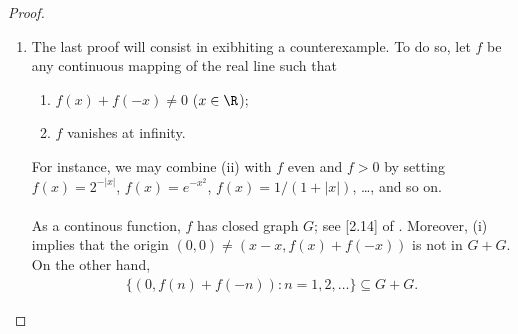 \begin{proof}
\begin{enumerate}
Now pick $c\in X$ outside $A+B$: %
The result will be established by showing that $c$ is not in the closure %
of $A+B$. \\
\\
To do so, we let the variable $\mathit{a}$ range over $A$: %
Every set $a+B$ is closed as well; see Section 1.7 of \cite{FA}. %
%
Trivially, $a+B \neq c$: By Section 1.10 of \cite{FA}, %
there so exists $V=V(a)$ a neighborhood of the origin such that %
%
\begin{align}\label{separation}
  (a+B + V) \cap (c+V) = \emptyset.
\end{align}
%
Moreover, there are finitely many $a+V$, say $a_1 + V_1, a_2 + V_2, \dots$, %
whose union $U$ contains the compact set $A$. Therefore, %
%
\begin{align}\label{U + B encloses A + B}
  A+B \subseteq U + B.
\end{align}
%
Now define %
\begin{align}
  W \triangleq V_1 \cap V_2 \cap \cdots, 
\end{align}
%
so that 
%
\begin{align}
  (a_i + B + V_i) \cap (c + W) \overset{(\ref{separation})}{=} \emptyset %
  \quad (i = 1, 2, \dots).
\end{align}
%
As a conclusion, $c$ is not in the closure of $U+B$. %
Finally, (\ref{U + B encloses A + B}) asserts that %
$c$ is not in $\overline{A+B}$ either; which achieves the proof. \\
\\
\textbf{Corollary}: If $B$ is the closure of a set $S$, then %
%
\begin{align}
  A+B \subseteq \overline{A+S} \subseteq \overline{A+B} = A + B
\end{align}
%
by (b) of Section 1.13 of \cite{FA} (since $A$ is closed; %
see Section 1.12, from the same source). %
The special case $A = \{x\}$, $B=X$ %
will occur in the proof of Exercise 15 in chapter 2. %
%
\item The last proof will consist in exibhiting a counterexample. %
To do so, let $f$ be any continuous mapping of the real line such that %
\renewcommand{\labelenumii}{(\roman{enumii})} 
\begin{enumerate}
  \item $f(x) + f(\minus x) \neq 0$ \quad ($x \in \R$);
  \item $f$ vanishes at infinity. 
\end{enumerate}
For instance, we may combine (ii) with $f$ even and $f>0$ by setting %
%
  $f(x) = 2^{\minus |x|}$, %
  $f(x) = e^{\minus x^2}$, %
  $f(x) = 1/(1+|x|)$, \dots, %
%
and so on. \\
\\
As a continous function, $f$ has closed graph $G$; see [2.14] of \cite{FA}. %
%
Moreover, (i) implies that the origin %
%
  $(0, 0) \neq \left(x-x, f(x)+ f(\minus x)\right)$ %
% 
is not in $G+G$. %
%
On the other hand, 
%
\begin{align}
  \{ \left(0, f(n) + f(\minus n)\right): n=1, 2, \dots\} \subseteq G + G.
\end{align}
%


\end{enumerate}
\end{proof}
